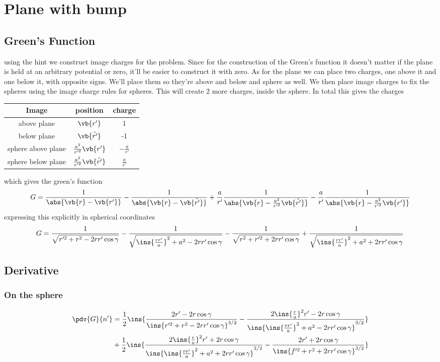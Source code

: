 \clearpage
\section{Plane with bump}
\subsection{Green's Function}
using the hint we construct image charges for the problem. Since for the construction of the Green's function it doesn't matter if the plane is held at an arbitrary potential or zero, it'll be easier to construct it with zero. As for the plane we can place two charges, one above it and one below it, with opposite signs. We'll place them so they're above and below and sphere as well. We then place image charges to fix the spheres using the image charge rules for spheres. This will create 2 more charges, inside the sphere. In total this gives the charges 

\begin{table}[H]
	\centering
	\begin{tabular}{c|cc}
		Image & position & charge\\
		\hline
		above plane & \(\vb{r'}\) & 1\\
		below plane & \(\vb{\tilde{r'}}\) & -1\\
		sphere above plane & \(\frac{a^2}{r'^2}\vb{r'}\) & \(-\frac{a}{r'}\)\\
		sphere below plane & \(\frac{a^2}{r'^2}\vb{\tilde{r'}}\) & \(\frac{a}{r'}\)
	\end{tabular}
\end{table}
which gives the green's function
\begin{equation}
	G = \frac{1}{\abs{\vb{r}-\vb{r'}}}-\frac{1}{\abs{\vb{r}-\vb{\tilde{r'}}}}+\frac{a}{r'}\frac{1}{\abs{\vb{r}-\frac{a^2}{r'^2}\vb{\tilde{r'}}}}-\frac{a}{r'}\frac{1}{\abs{\vb{r}-\frac{a^2}{r'^2}\vb{r'}}}
\end{equation}
expressing this explicitly in spherical coordinates
\begin{equation}
	G = \frac{1}{\sqrt{r'^2+r^2-2rr'\cos\gamma}}-\frac{1}{\sqrt{\ins{\frac{rr'}{a}}^2+a^2-2rr'\cos\gamma}}-\frac{1}{\sqrt{r^2+r'^2+2rr'\cos\gamma}}+\frac{1}{\sqrt{\ins{\frac{rr'}{a}}^2+a^2+2rr'\cos\gamma}}
\end{equation}
\subsection{Derivative}
\subsubsection{On the sphere}
\begin{align}
	\pdv{G}{n'} &= \frac{1}{2}\ins{\frac{2r'-2r\cos\gamma}{\ins{r'^2+r^2-2rr'\cos\gamma}^{3/2}}-\frac{2\ins{\frac{r}{a}}^2r'-2r\cos\gamma}{\ins{\ins{\frac{rr'}{a}}^2+a^2-2rr'\cos\gamma}^{3/2}}}\\
	&+\frac{1}{2}\ins{\frac{2\ins{\frac{r}{a}}^2r'+2r\cos\gamma}{\ins{\ins{\frac{rr'}{a}}^2+a^2+2rr'\cos\gamma}^{3/2}}-\frac{2r'+2r\cos\gamma}{\ins{f'^2+r^2+2rr'\cos\gamma}^{3/2}}}
\end{align}
